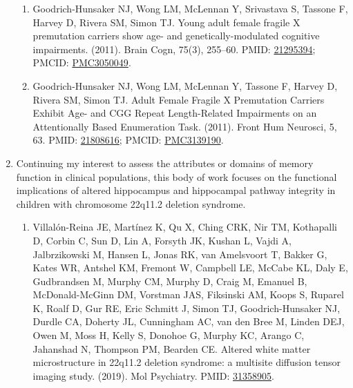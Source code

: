 \documentclass{nihbiosketch}
\begin{document}
\begin{enumerate}
\begin{enumerate}
	      	\item Goodrich-Hunsaker NJ, Wong LM, McLennan Y, Srivastava S, Tassone F, Harvey D, Rivera SM, Simon TJ. Young adult female fragile X premutation carriers show age- and genetically-modulated cognitive impairments. (2011). Brain Cogn, 75(3), 255--60. PMID: \href{https:/pubmed.gov/21295394}{21295394}; PMCID: \href{https://www.ncbi.nlm.nih.gov/pmc/articles/PMC3050049}{PMC3050049}. 
	      	      
	      	\item Goodrich-Hunsaker NJ, Wong LM, McLennan Y, Tassone F, Harvey D, Rivera SM, Simon TJ. Adult Female Fragile X Premutation Carriers Exhibit Age- and CGG Repeat Length-Related Impairments on an Attentionally Based Enumeration Task. (2011). Front Hum Neurosci, 5, 63. PMID: \href{https:/pubmed.gov/21808616}{21808616}; PMCID: \href{https://www.ncbi.nlm.nih.gov/pmc/articles/PMC3139190}{PMC3139190}.
	      	      
	      \end{enumerate}
	     
    \item Continuing my interest to assess the attributes or domains of memory function in clinical populations, this body of work focuses on the functional implications of altered hippocampus and hippocampal pathway integrity in children with chromosome 22q11.2 deletion syndrome.
	      
	      \begin{enumerate}   
	      	
	      	\item Villalón-Reina JE, Martínez K, Qu X, Ching CRK, Nir TM, Kothapalli D, Corbin C, Sun D, Lin A, Forsyth JK, Kushan L, Vajdi A, Jalbrzikowski M, Hansen L, Jonas RK, van Amelsvoort T, Bakker G, Kates WR, Antshel KM, Fremont W, Campbell LE, McCabe KL, Daly E, Gudbrandsen M, Murphy CM, Murphy D, Craig M, Emanuel B, McDonald-McGinn DM, Vorstman JAS, Fiksinski AM, Koops S, Ruparel K, Roalf D, Gur RE, Eric Schmitt J, Simon TJ, Goodrich-Hunsaker NJ, Durdle CA, Doherty JL, Cunningham AC, van den Bree M, Linden DEJ, Owen M, Moss H, Kelly S, Donohoe G, Murphy KC, Arango C, Jahanshad N, Thompson PM, Bearden CE. Altered white matter microstructure in 22q11.2 deletion syndrome: a multisite diffusion tensor imaging study. (2019). Mol Psychiatry. PMID: \href{https://www.pubmed.gov/31358905}{31358905}.
	      	

\end{enumerate}
\end{enumerate}
\end{document}
